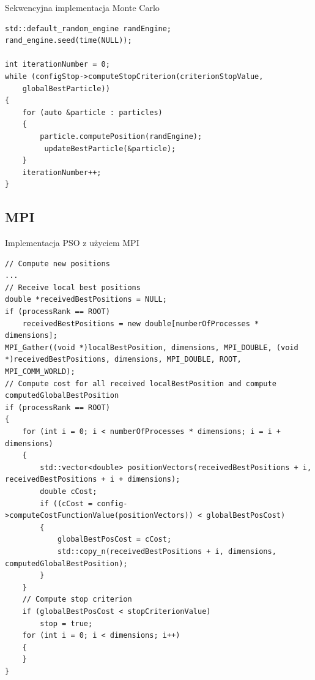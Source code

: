 \documentclass[handout]{beamer}
\begin{document}
\begin{frame}[fragile]{Sekwencyjna implementacja Monte Carlo}
\vspace{-.8cm}

\begin{lstlisting}[style=mycpp, label=code:mc_before, caption={Optymalizacja Monte Carlo - kod sekwencyjny.}]
std::default_random_engine randEngine;
rand_engine.seed(time(NULL));

int iterationNumber = 0;
while (configStop->computeStopCriterion(criterionStopValue,
    globalBestParticle))
{
    for (auto &particle : particles)
    {
        particle.computePosition(randEngine);
         updateBestParticle(&particle);
    }
    iterationNumber++;
}
\end{lstlisting}

\end{frame}



\subsection{MPI}
\begin{frame}[fragile]{Implementacja PSO z użyciem MPI}

\vspace{-.8cm}

\begin{lstlisting}[style=mycpp, caption={MPI -- PSO \textit{typedef}}]
// Compute new positions 
...
// Receive local best positions
double *receivedBestPositions = NULL;
if (processRank == ROOT)
    receivedBestPositions = new double[numberOfProcesses * dimensions];
MPI_Gather((void *)localBestPosition, dimensions, MPI_DOUBLE, (void *)receivedBestPositions, dimensions, MPI_DOUBLE, ROOT, MPI_COMM_WORLD);
// Compute cost for all received localBestPosition and compute computedGlobalBestPosition
if (processRank == ROOT)
{
    for (int i = 0; i < numberOfProcesses * dimensions; i = i + dimensions)
    {
        std::vector<double> positionVectors(receivedBestPositions + i, receivedBestPositions + i + dimensions);
        double cCost;
        if ((cCost = config->computeCostFunctionValue(positionVectors)) < globalBestPosCost)
        {
            globalBestPosCost = cCost;
            std::copy_n(receivedBestPositions + i, dimensions, computedGlobalBestPosition);
        }
    }
    // Compute stop criterion
    if (globalBestPosCost < stopCriterionValue)
        stop = true;
    for (int i = 0; i < dimensions; i++)
    {
    }
}
\end{lstlisting}
\end{frame}
\end{document}
